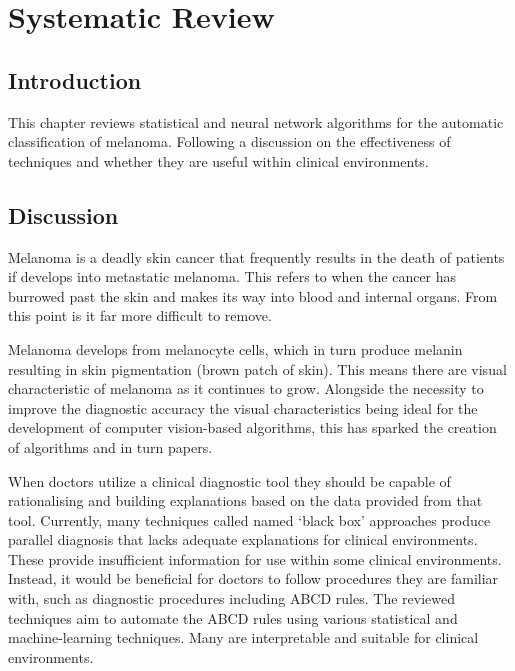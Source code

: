 \cleardoublepage
\chapter{Systematic Review}

\section{Introduction}
This chapter reviews statistical and neural network algorithms for the automatic classification of melanoma. Following a discussion on the effectiveness of techniques and whether they are useful within clinical environments. 


\section{Discussion}

Melanoma is a deadly skin cancer that frequently results in the death of patients if develops into metastatic melanoma. This refers to when the cancer has burrowed past the skin and makes its way into blood and internal organs. From this point is it far more difficult to remove.

Melanoma develops from melanocyte cells, which in turn produce melanin resulting in skin pigmentation (brown patch of skin). This means there are visual characteristic of melanoma as it continues to grow. Alongside the necessity to improve the diagnostic accuracy the visual characteristics being ideal for the development of computer vision-based algorithms, this has sparked the creation of algorithms and in turn papers.

When doctors utilize a clinical diagnostic tool they should be capable of rationalising and building explanations based on the data provided from that tool. Currently, many techniques\cite{Andre2017} called named `black box' approaches produce parallel diagnosis that lacks adequate explanations for clinical environments. These provide insufficient information for use within some clinical environments\cite{Andre2017}. Instead, it would be beneficial for doctors to follow procedures they are familiar with, such as diagnostic procedures including ABCD rules. The reviewed techniques aim to automate the ABCD rules using various statistical and machine-learning techniques. Many are interpretable and suitable for clinical environments.

